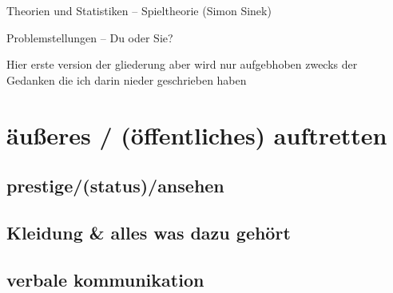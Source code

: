 Theorien und Statistiken
            -- Spieltheorie (Simon Sinek)

Problemstellungen
            -- Du oder Sie?















Hier erste version der gliederung aber wird nur aufgebhoben zwecks der Gedanken die ich darin nieder geschrieben haben


%
%

\part{äußeres / (öffentliches) auftretten}
    \chapter{prestige/(status)/ansehen}
     
    \chapter{Kleidung & alles was dazu gehört}

    \chapter{verbale kommunikation}
